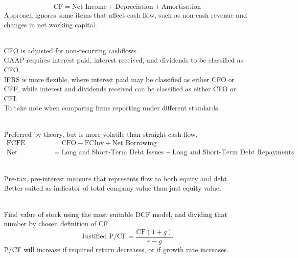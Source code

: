 \begin{definition} 
\begin{equation}
\text{CF} = \text{Net Income} + \text{Depreciation} + \text{Amortisation} \nonumber
\end{equation}
Approach ignores some items that affect cash flow, such as non-cash revenue and changes in net working capital.
\end{definition}

\begin{definition} \\
CFO is adjusted for non-recurring cashflows.\\
GAAP requires interest paid, interest received, and dividends to be classified as CFO.\\
IFRS is more flexible, where interest paid may be classified as either CFO or CFF, while interest and dividends received can be classified as either CFO or CFI.\\
To take note when comparing firms reporting under different standards.
\end{definition}

\begin{definition} \\
Preferred by theory, but is more volatile than straight cash flow.
\begin{align}
\text{FCFE} &= \text{CFO} - \text{FCInv} + \text{Net Borrowing} \nonumber \\
\text{Net Borrowing} &= \text{Long and Short-Term Debt Issues} - \text{Long and Short-Term Debt Repayments} \nonumber
\end{align}
\end{definition}

\begin{definition}  \\
Pre-tax, pre-interest measure that represents flow to both equity and debt.\\
Better suited as indicator of total company value than just equity value.
\end{definition}

\begin{definition} \\
Find value of stock using the most suitable DCF model, and dividing that number by chosen definition of CF.
\begin{equation}
\text{Justified P/CF} = \frac{\text{CF}(1+g)}{r-g} \nonumber
\end{equation}
P/CF will increase if required return decreases, or if growth rate increases.
\end{definition}

